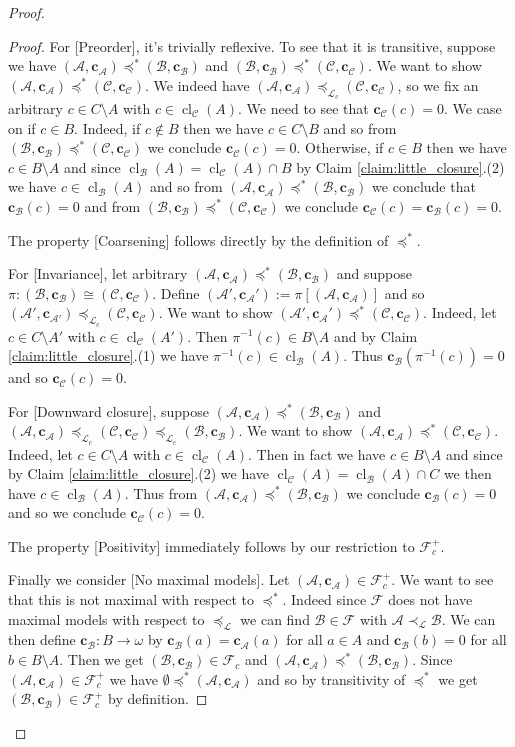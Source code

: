 \documentclass[12pt]{amsart}
\theoremstyle{plain}
\theoremstyle{definition}
\newcommand{\isom}{\cong}
\newcommand{\mcA}{\mathcal{A}}
\newcommand{\mcB}{\mathcal{B}}
\newcommand{\mcC}{\mathcal{C}}
\newcommand{\mcF}{\mathcal{F}}
\newcommand{\mcL}{\mathcal{L}}
\newcommand{\oc}{\mathbf{c}}
\DeclareMathOperator{\cl}{cl}
\begin{document}
\begin{proof}
\begin{proof}
For [Preorder], it's trivially reflexive.
To see that it is transitive, suppose we have $(\mcA, \oc_\mcA) \preceq^* (\mcB, \oc_\mcB)$ and $(\mcB, \oc_\mcB) \preceq^* (\mcC, \oc_\mcC)$.
We want to show $(\mcA, \oc_\mcA) \preceq^* (\mcC, \oc_\mcC)$.
We indeed have $(\mcA, \oc_\mcA) \preceq_{\mcL_c} (\mcC, \oc_\mcC)$, so we fix an arbitrary $c \in C \setminus A$ with $c \in \cl_\mcC(A)$.
We need to see that $\oc_\mcC(c) = 0$.
We case on if $c \in B$.
Indeed, if $c \not\in B$ then we have $c \in C \setminus B$ and so from $(\mcB, \oc_\mcB) \preceq^* (\mcC, \oc_\mcC)$ we conclude $\oc_\mcC(c) = 0$.
Otherwise, if $c \in B$ then we have $c \in B \setminus A$ and since $\cl_\mcB(A) = \cl_\mcC(A) \cap B$ by Claim \ref{claim:little_closure}.(2) we have $c \in \cl_\mcB(A)$ and so from $(\mcA, \oc_\mcA) \preceq^* (\mcB, \oc_\mcB)$ we conclude that $\oc_\mcB(c) = 0$ and from $(\mcB, \oc_\mcB) \preceq^* (\mcC, \oc_\mcC)$ we conclude $\oc_\mcC(c) = \oc_\mcB(c) = 0$.

The property [Coarsening] follows directly by the definition of $\preceq^*$.

For [Invariance], let arbitrary $(\mcA, \oc_\mcA) \preceq^* (\mcB, \oc_\mcB)$ and suppose $\pi : (\mcB, \oc_\mcB) \isom (\mcC, \oc_\mcC)$.
Define $(\mcA', \oc_\mcA') := \pi[(\mcA, \oc_\mcA)]$ and so $(\mcA', \oc_{\mcA'}) \preceq_{\mcL_c} (\mcC, \oc_\mcC)$.
We want to show $(\mcA', \oc_\mcA') \preceq^* (\mcC, \oc_\mcC)$.
Indeed, let $c \in C \setminus A'$ with $c \in \cl_\mcC(A')$.
Then $\pi^{-1}(c) \in B \setminus A$ and by Claim \ref{claim:little_closure}.(1) we have $\pi^{-1}(c) \in \cl_\mcB(A)$.
Thus $\oc_\mcB(\pi^{-1}(c)) = 0$ and so $\oc_\mcC(c) = 0$.

For [Downward closure], suppose $(\mcA, \oc_\mcA) \preceq^* (\mcB, \oc_\mcB)$ and $(\mcA, \oc_\mcA) \preceq_{\mcL_c} (\mcC, \oc_\mcC) \preceq_{\mcL_c} (\mcB, \oc_\mcB)$.
We want to show $(\mcA, \oc_\mcA) \preceq^* (\mcC, \oc_\mcC)$.
Indeed, let $c \in C \setminus A$ with $c \in \cl_\mcC(A)$.
Then in fact we have $c \in B \setminus A$ and since by Claim \ref{claim:little_closure}.(2) we have $\cl_\mcC(A) = \cl_\mcB(A) \cap C$ we then have $c \in \cl_\mcB(A)$.
Thus from $(\mcA, \oc_\mcA) \preceq^* (\mcB, \oc_\mcB)$ we conclude $\oc_\mcB(c) = 0$ and so we conclude $\oc_\mcC(c) = 0$.

The property [Positivity] immediately follows by our restriction to $\mcF_c^+$.

Finally we consider [No maximal models].
Let $(\mcA, \oc_\mcA) \in \mcF_c^+$.
We want to see that this is not maximal with respect to $\preceq^*$.
Indeed since $\mcF$ does not have maximal models with respect to $\preceq_\mcL$ we can find $\mcB \in \mcF$ with $\mcA \prec_\mcL \mcB$.
We can then define $\oc_\mcB : B \rightarrow \omega$ by $\oc_{\mcB}(a) = \oc_{\mcA}(a)$ for all $a \in A$ and $\oc_{\mcB}(b) = 0$ for all $b \in B \setminus A$.
Then we get $(\mcB, \oc_\mcB) \in \mcF_c$ and $(\mcA, \oc_\mcA) \preceq^* (\mcB, \oc_\mcB)$.
Since $(\mcA, \oc_\mcA) \in \mcF_c^+$ we have $\emptyset \preceq^* (\mcA, \oc_\mcA)$ and so by transitivity of $\preceq^*$ we get $(\mcB, \oc_\mcB) \in \mcF_c^+$ by definition.


\end{proof}
\end{proof}
\end{document}
